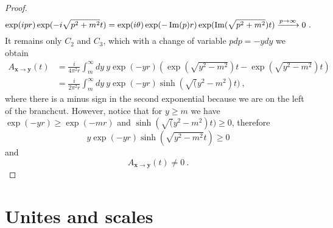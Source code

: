 \begin{proof}
\begin{equation*}
            \exp(i p r) \exp(- i \sqrt{p^2 + m^2}t) = \exp(i \theta) \exp(- \operatorname{Im} (p) r) \exp(\operatorname{Im} (\sqrt{p^2 + m^2}) t) \xrightarrow{p \rightarrow \infty} 0~.
        \end{equation*}
        It remains only $C_2$ and $C_3$, which with a change of variable $p dp = - y dy$ we obtain
        \begin{equation*}
        \begin{aligned}
            A_{\mathbf x \rightarrow \mathbf y} (t) & = \frac{i}{4 \pi^2 r} \int_m^\infty dy ~ y \exp(- y r) (\exp(\sqrt{y^2 - m^2})t - \exp(\sqrt{y^2 - m^2})t)\\ &  = \frac{i}{2 \pi^2 r} \int_m^\infty dy ~ y \exp(- y r) \sinh (\sqrt(y^2 - m^2) t) ~,
        \end{aligned}
        \end{equation*}
        where there is a minus sign in the second exponential because we are on the left of the branchcut. However, notice that for $y \geq m$ we have $\exp(-yr) \geq \exp(-mr)$ and $\sinh (\sqrt(y^2 - m^2) t) \geq 0$, therefore
        \begin{equation*}
            y \exp(-yr) \sinh(\sqrt{y^2 - m^2} t) \geq 0 
        \end{equation*}
        and 
        \begin{equation*}
            A_{\mathbf x \rightarrow \mathbf y} (t) \neq 0 ~.
        \end{equation*}
    \end{proof}

\section{Unites and scales}

